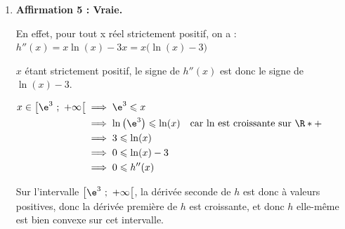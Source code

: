 \begin{enumerate}
	$\vect{\mathrm{AB}}\cdot\vect{\mathrm{AC}} = 4\times 1 + (-2)\times 0 + 6 \times 1 = 10$,\quad la première partie de l'affirmation est donc vraie.

	Cependant, on peut aussi calculer les normes et en déduire le cosinus de l'angle $\widehat{\mathrm{BAC}}$, défini par les deux vecteurs.

	$\mathrm{AB} = \sqrt{4^2 + (-2)^2 + 6^2} = \sqrt{16 + 4 + 36} = \sqrt{56} = \sqrt{4 \times 14} = 2\sqrt{14}$.

	$\mathrm{AC} = \sqrt{1^2 + 0^2 + 1^2} = \sqrt{1 + 0 + 1} = \sqrt{2}$.

	On a donc, avec la définition trigonométrique du produit scalaire :

	$ \vect{\mathrm{AB}}\cdot\vect{\mathrm{AC}} = \mathrm{AB}\times \mathrm{AC}\times \cos\left(\widehat{\mathrm{BAC}}\right) = 2\sqrt{14}\times \sqrt{2} \times \cos\left(\widehat{\mathrm{BAC}}\right) = 4\sqrt{7}\cos\left(\widehat{\mathrm{BAC}}\right)$

	En égalant ces deux expressions du produit scalaire, on déduit :

	$10 = 4\sqrt{7}\cos\left(\widehat{\mathrm{BAC}}\right)$\quad qui équivaut à :\quad $\cos\left(\widehat{\mathrm{BAC}}\right) = \dfrac{10}{4\sqrt{7}} = \dfrac{5\sqrt{7}}{14}$.

	Il se trouve que le cosinus de 30\degres{} est connu, il vaut $\dfrac{\sqrt{3}}{2}$ et est donc différent de celui trouvé ici : l'angle ne mesure dont pas 30\degres.

\textbf{Remarque :} une valeur approchée d'une mesure de l'angle peut être obtenue à la calculatrice :

$\widehat{\mathrm{BAC}} = \arccos\left(\dfrac{5\sqrt{7}}{14}\right)\approx 19$\degres.

\item \textbf{Affirmation 5 : Vraie.}

En effet, pour tout x réel strictement positif, on a :\quad $ h''(x) = x\ln(x) - 3x = x\big(\ln(x) - 3\big)$

$x$ étant strictement positif, le signe de $h''(x)$ est donc le signe de $\ln(x)-3$.

	$\begin{aligned}
		x \in \big[\e^{3}~;~+\infty\big[ &\implies \e^{3} \leqslant x\\
		&\implies \ln\big(\e^{3}\big) \leqslant \ln(x)\quad\text{car ln est croissante sur }\R*+\\
		&\implies 3\leqslant \ln(x)\\
		&\implies 0 \leqslant \ln(x) - 3\\
		&\implies 0\leqslant h''(x)
	\end{aligned}$

	Sur l'intervalle $\big[\e^{3}~;~+\infty\big[$, la dérivée seconde de $h$ est donc à valeurs positives, donc la dérivée première de $h$ est croissante, et donc $h$ elle-même est bien convexe sur cet intervalle.
\end{enumerate}

